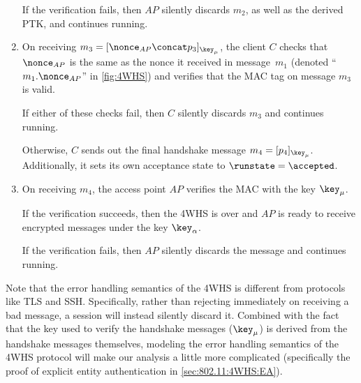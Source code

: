 \begin{enumerate}
	 

	If the verification fails,
	then $AP$ silently discards $m_2$,
	as well as the derived PTK,  
	and continues running.
	
	\item 
	On receiving $m_3 = [\nonce_{AP} \concat p_3]_{\key_{\mu}}$, 
	the client $C$  checks that $\nonce_{AP}$ is the same as the nonce it received in message~$m_1$ 
	(denoted ``$m_1.\nonce_{AP}$'' in \cref{fig:4WHS})
	and verifies that the MAC tag on message $m_3$ is valid.

	If either of these checks fail,
	then $C$ silently discards $m_3$ and continues running.

	Otherwise,
	$C$ sends out the final handshake message $m_4 = [p_4]_{\key_\mu}$.
	Additionally,
	it sets its own acceptance state to $\runstate = \accepted$. 
	

	
	\item On receiving $m_4$, the access point $AP$ verifies the MAC with the key $\key_\mu$.

	If the verification succeeds,
	then the 4WHS is over and $AP$ is ready to receive encrypted messages under the key $\key_\alpha$.

	If the verification fails,
	then $AP$ silently discards the message and continues running.

\end{enumerate}





Note that the error handling semantics of the 4WHS is different from protocols like TLS and SSH.
Specifically,
rather than rejecting immediately on receiving a bad message,
a session will instead silently discard it.
Combined with the fact that the key used to verify the handshake messages ($\key_{\mu}$)
is derived from the handshake messages themselves,
modeling the error handling semantics of the 4WHS protocol will make our analysis a little more complicated
(specifically the proof of explicit entity authentication in \cref{sec:802.11:4WHS:EA}).








